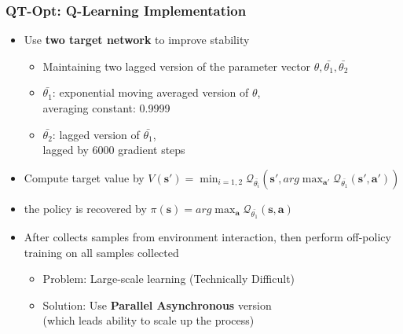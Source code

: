 \documentclass{beamer}
\renewcommand{\vec}[1]{\mathbf{#1}}
\newcommand{\forthSec}{QT-Opt}
\begin{document}
    \begin{frame}
      \frametitle{\forthSec: Q-Learning Implementation}
      \begin{itemize}
        \item Use \textbf{two target network} to improve stability
        \begin{itemize}
          \item Maintaining two lagged version of the parameter vector $\theta, \bar{\theta_1}, \bar{\theta_2}$
          \item $\bar{\theta_1}$: exponential moving averaged version of $\theta$, \\ 
                averaging constant: 0.9999
          \item $\bar{\theta_2}$: lagged version of $\bar{\theta_1}$, \\
                lagged by 6000 gradient steps
        \end{itemize}
        \item Compute target value by $V(\vec{s'}) = \min_{i = 1, 2}\mathcal{Q}_{\bar{\theta_i}}(\vec{s'}, arg\max_{\vec{a'}}\mathcal{Q}_{\bar{\theta_1}}(\vec{s'}, \vec{a'}))$
        \item the policy is recovered by $\pi(\vec{s}) = arg\max_{\vec{a}}\mathcal{Q}_{\bar{\theta_1}}(\vec{s}, \vec{a})$
        \item After collects samples from environment interaction, then perform off-policy training on all samples collected
        \begin{itemize}
          \item Problem: Large-scale learning (Technically Difficult)
          \item Solution: Use \textbf{Parallel Asynchronous} version \\
                (which leads ability to scale up the process)
        \end{itemize}
      \end{itemize}
    \end{frame}
\end{document}
